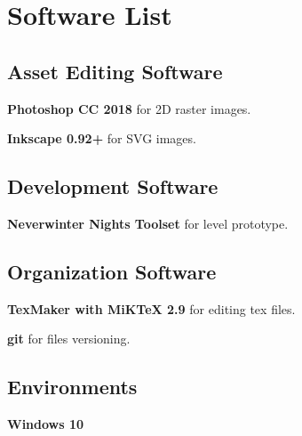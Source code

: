 \section{Software List}

\subsection{Asset Editing Software}
\textbf{Photoshop CC 2018} for 2D raster images.

\textbf{Inkscape 0.92+} for SVG images.

\subsection{Development Software}
\textbf{Neverwinter Nights Toolset} for level prototype.

\subsection{Organization Software}
\textbf{TexMaker with MiKTeX 2.9} for editing tex files.

\textbf{git} for files versioning.

\subsection{Environments}
\textbf{Windows 10}

